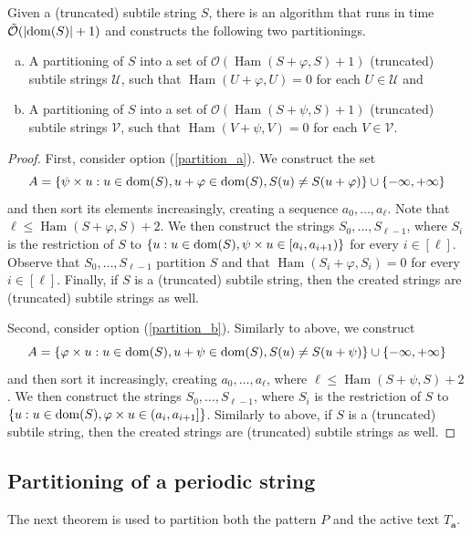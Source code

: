 \documentclass[twoside,leqno]{article}
\renewcommand{\O}{\mathcal{O}}
\newcommand{\tO}{\tilde{\mathcal{O}}}
\newcommand{\U}{\mathcal{U}}
\newcommand{\V}{\mathcal{V}}
\newcommand{\Ta}{T_\mathbf{a}}
\renewcommand{\phi}{\varphi}
\newcommand{\set}[1]{\left\lbrace #1 \right\rbrace}
\DeclareMathOperator*{\Ham}{Ham}
\newcommand{\absolute}[1]{\left\lvert#1\right\rvert}
\begin{document}
\begin{lemma}\label{cut_partitioning}
Given a (truncated) subtile string $S$, there is an algorithm that runs in time $\tO(\absolute{\d{S}} + 1)$ and constructs the following two partitionings.
	\begin{enumerate}[(a)]
		\item A partitioning of $S$ into a set of $\O(\Ham(S + \phi, S) + 1)$ (truncated) subtile strings $\U$, such that $\Ham(U + \phi, U) = 0$ for each $U \in \U$ and \label{partition_a}
		\item A partitioning of $S$ into a set of $\O(\Ham(S + \psi, S) + 1)$ (truncated) subtile strings $\V$, such that $\Ham(V + \psi, V) = 0$ for each $V \in \V$. \label{partition_b}
	\end{enumerate}
	\begin{proof}
		First, consider option (\ref{partition_a}). We construct the set
		\[ A = \set{\s{u} : u \in \d{S}, u + \phi \in \d{S}, S(u) \neq S(u + \phi)} \cup \set{-\infty, +\infty}\]
		and then sort its elements increasingly, creating a sequence $a_0, \dots, a_\ell$.
		Note that $\ell \le \Ham(S + \phi, S) + 2$.
		We then construct the strings $S_0, \dots, S_{\ell - 1}$, where $S_i$ is the restriction of $S$ to
		$\set{u : u \in \d{S}, \s{u} \in [a_i, a_{i + 1})}$ for every $i \in [\ell]$.
		Observe that $S_0, \dots, S_{\ell - 1}$ partition $S$ and that $\Ham(S_i + \phi, S_i) = 0$ for every $i \in [\ell]$. Finally, if $S$ is a (truncated) subtile string, then the created strings are (truncated) subtile strings as well.
	
		Second, consider option (\ref{partition_b}). Similarly to above, we construct
		\[ A = \set{\h{u} : u \in \d{S}, u + \psi \in \d{S}, S(u) \neq S(u + \psi)} \cup \set{-\infty, +\infty} \]
		and then sort it increasingly, creating $a_0, \dots, a_\ell$, where $\ell \le \Ham(S + \psi, S) + 2$.
		We then construct the strings $S_0, \dots, S_{\ell - 1}$, where $S_i$ is the restriction of $S$ to 
		$\set{u : u \in \d{S}, \h{u} \in (a_i, a_{i + 1}]}$. Similarly to above, if $S$ is a (truncated) subtile string, then the created strings are (truncated) subtile strings as well.
	\end{proof}
\end{lemma}


\subsection{Partitioning of a periodic string}
The next theorem is used to partition both the pattern $P$ and the active text $\Ta$.
\end{document}
